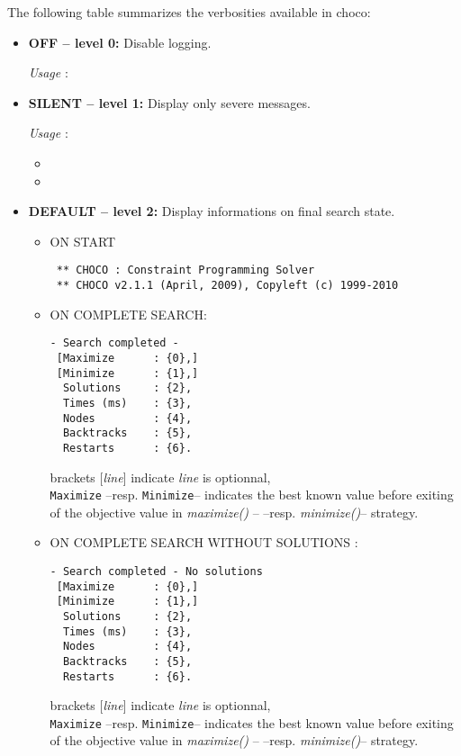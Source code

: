 The following table summarizes the verbosities available in choco: 
\begin{itemize}
	\item \textbf{OFF -- level 0:} Disable logging.	 

	\vspace{0.2cm} 
	\textit{Usage} :  
	
	\item \textbf{SILENT -- level 1:} Display only severe messages.
	
	\vspace{0.2cm} 
	\textit{Usage} : 
		\begin{itemize}
		\item {}
		\item {}
		\end{itemize}
	
	\item \textbf{DEFAULT -- level 2:} Display informations on final search state.
		\begin{itemize}
			\item ON START
\begin{lstlisting}
 ** CHOCO : Constraint Programming Solver
 ** CHOCO v2.1.1 (April, 2009), Copyleft (c) 1999-2010
 \end{lstlisting}
			\item ON COMPLETE SEARCH:
				\begin{lstlisting}
- Search completed -
 [Maximize		: {0},]
 [Minimize		: {1},]
  Solutions		: {2},
  Times (ms)	: {3},
  Nodes			: {4},
  Backtracks	: {5},
  Restarts		: {6}.
  \end{lstlisting}
	brackets [\textit{line}] indicate \textit{line} is optionnal,\\
 	\texttt{Maximize} --resp. \texttt{Minimize}-- indicates the best known value before exiting of the objective value in \textit{maximize()} -- --resp. \textit{minimize()}-- strategy.

			\item ON COMPLETE SEARCH WITHOUT SOLUTIONS :
				\begin{lstlisting}
- Search completed - No solutions
 [Maximize		: {0},]
 [Minimize		: {1},]
  Solutions		: {2},
  Times (ms)	: {3},
  Nodes			: {4},
  Backtracks	: {5},
  Restarts		: {6}.
\end{lstlisting}
	brackets [\textit{line}] indicate \textit{line} is optionnal,\\
 	\texttt{Maximize} --resp. \texttt{Minimize}-- indicates the best known value before exiting of the objective value in \textit{maximize()} -- --resp. \textit{minimize()}-- strategy.


\end{itemize}
\end{itemize}
